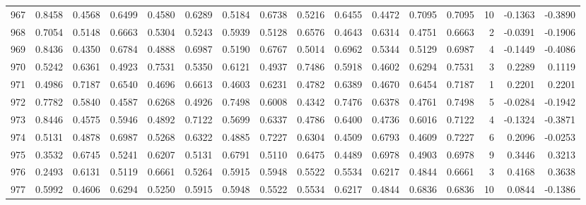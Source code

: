 \begin{tabular}{lrrrrrrrrrrrrrrr}
967 &      0.8458 &  0.4568 &  0.6499 &  0.4580 &  0.6289 &  0.5184 &  0.6738 &  0.5216 &  0.6455 &  0.4472 &   0.7095 &     0.7095 &     10 &                   -0.1363 &                    -0.3890 \\
968 &      0.7054 &  0.5148 &  0.6663 &  0.5304 &  0.5243 &  0.5939 &  0.5128 &  0.6576 &  0.4643 &  0.6314 &   0.4751 &     0.6663 &      2 &                   -0.0391 &                    -0.1906 \\
969 &      0.8436 &  0.4350 &  0.6784 &  0.4888 &  0.6987 &  0.5190 &  0.6767 &  0.5014 &  0.6962 &  0.5344 &   0.5129 &     0.6987 &      4 &                   -0.1449 &                    -0.4086 \\
970 &      0.5242 &  0.6361 &  0.4923 &  0.7531 &  0.5350 &  0.6121 &  0.4937 &  0.7486 &  0.5918 &  0.4602 &   0.6294 &     0.7531 &      3 &                    0.2289 &                     0.1119 \\
971 &      0.4986 &  0.7187 &  0.6540 &  0.4696 &  0.6613 &  0.4603 &  0.6231 &  0.4782 &  0.6389 &  0.4670 &   0.6454 &     0.7187 &      1 &                    0.2201 &                     0.2201 \\
972 &      0.7782 &  0.5840 &  0.4587 &  0.6268 &  0.4926 &  0.7498 &  0.6008 &  0.4342 &  0.7476 &  0.6378 &   0.4761 &     0.7498 &      5 &                   -0.0284 &                    -0.1942 \\
973 &      0.8446 &  0.4575 &  0.5946 &  0.4892 &  0.7122 &  0.5699 &  0.6337 &  0.4786 &  0.6400 &  0.4736 &   0.6016 &     0.7122 &      4 &                   -0.1324 &                    -0.3871 \\
974 &      0.5131 &  0.4878 &  0.6987 &  0.5268 &  0.6322 &  0.4885 &  0.7227 &  0.6304 &  0.4509 &  0.6793 &   0.4609 &     0.7227 &      6 &                    0.2096 &                    -0.0253 \\
975 &      0.3532 &  0.6745 &  0.5241 &  0.6207 &  0.5131 &  0.6791 &  0.5110 &  0.6475 &  0.4489 &  0.6978 &   0.4903 &     0.6978 &      9 &                    0.3446 &                     0.3213 \\
976 &      0.2493 &  0.6131 &  0.5119 &  0.6661 &  0.5264 &  0.5915 &  0.5948 &  0.5522 &  0.5534 &  0.6217 &   0.4844 &     0.6661 &      3 &                    0.4168 &                     0.3638 \\
977 &      0.5992 &  0.4606 &  0.6294 &  0.5250 &  0.5915 &  0.5948 &  0.5522 &  0.5534 &  0.6217 &  0.4844 &   0.6836 &     0.6836 &     10 &                    0.0844 &                    -0.1386 \\

\end{tabular}
